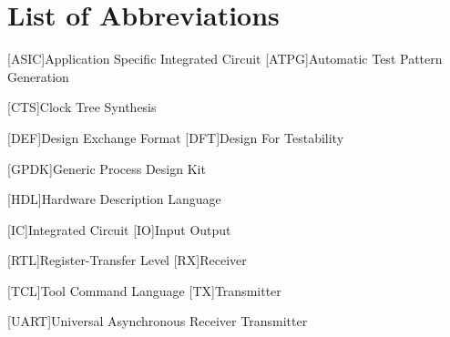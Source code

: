 \section*{List of Abbreviations}
\begin{acronym}
	[ASIC]{Application Specific Integrated Circuit}
	[ATPG]{Automatic Test Pattern Generation}
	
	[CTS]{Clock Tree Synthesis}
	
	
	[DEF]{Design Exchange Format}
	[DFT]{Design For Testability}
		
	[GPDK]{Generic Process Design Kit}
		
	[HDL]{Hardware Description Language}
	
	[IC]{Integrated Circuit}
	[IO]{Input Output}
		
	[RTL]{Register-Transfer Level}
	[RX]{Receiver}
		
	[TCL]{Tool Command Language}
	[TX]{Transmitter}
	
	[UART]{Universal Asynchronous Receiver Transmitter}
	
\end{acronym}


